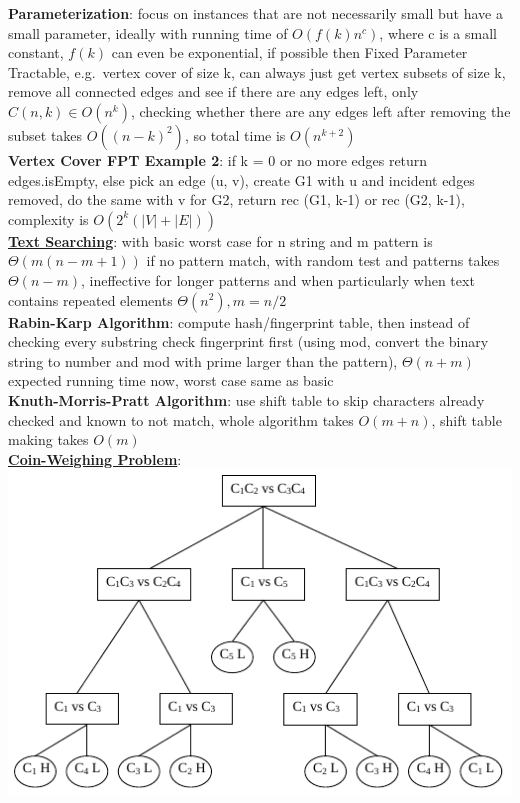 \documentclass[a4paper]{article}
\begin{document}
\begin{multicols}{2}
        \textbf{Parameterization}: focus on instances that are not necessarily small but have a small parameter, ideally with running time of $O(f(k)n^c)$, where c is a small constant, $f(k)$ can even be exponential, if possible then Fixed Parameter Tractable, e.g.\ vertex cover of size k, can always just get vertex subsets of size k, remove all connected edges and see if there are any edges left, only $C(n, k) \in O(n^k)$, checking whether there are any edges left after removing the subset takes $O({(n-k)}^2)$, so total time is $O(n^{k+2})$\\
        \textbf{Vertex Cover FPT Example 2}: if k = 0 or no more edges return edges.isEmpty, else pick an edge (u, v), create G1 with u and incident edges removed, do the same with v for G2, return rec (G1, k-1) or rec (G2, k-1), complexity is $O(2^k (|V|+|E|))$\\
        \underline{\textbf{Text Searching}}: with basic worst case for n string and m pattern is $\Theta(m(n-m+1))$ if no pattern match, with random test and patterns takes $\Theta(n-m)$, ineffective for longer patterns and when particularly when text contains repeated elements $\Theta(n^2), m=n/2$\\
        \textbf{Rabin-Karp Algorithm}: compute hash/fingerprint table, then instead of checking every substring check fingerprint first (using mod, convert the binary string to number and mod with prime larger than the pattern), $\Theta(n+m)$ expected running time now, worst case same as basic\\
        \textbf{Knuth-Morris-Pratt Algorithm}: use shift table to skip characters already checked and known to not match, whole algorithm takes $O(m+n)$, shift table making takes $O(m)$\\
        \underline{\textbf{Coin-Weighing Problem}}:\\
        \includegraphics[width=\linewidth]{coinweigh.png}\\

\end{multicols}
\end{document}
